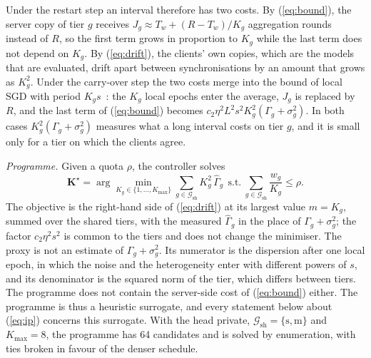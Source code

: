 \documentclass[journal]{IEEEtran}
\newcommand{\Gh}{\hat\Gamma}
\begin{document}
Under the restart step an interval therefore has two costs. By (\ref{eq:bound}), the server copy of tier $g$ receives $J_g\approx T_w+(R-T_w)/K_g$ aggregation rounds instead of $R$, so the first term grows in proportion to $K_g$ while the last term does not depend on $K_g$. By (\ref{eq:drift}), the clients' own copies, which are the models that are evaluated, drift apart between synchronisations by an amount that grows as $K_g^2$. Under the carry-over step the two costs merge into the bound of local SGD with period $K_gs$~\cite{wang2021coop}: the $K_g$ local epochs enter the average, $J_g$ is replaced by $R$, and the last term of (\ref{eq:bound}) becomes $c_2\eta^2L^2s^2K_g^2(\Gamma_g+\sigma_g^2)$. In both cases $K_g^2(\Gamma_g+\sigma_g^2)$ measures what a long interval costs on tier $g$, and it is small only for a tier on which the clients agree.

\emph{Programme.} Given a quota $\rho$, the controller solves
\begin{equation}
\mathbf K^\star=\arg\min_{K_g\in\{1,\dots,K_{\max}\}}\sum_{g\in\mathcal G_{\mathrm{sh}}}K_g^2\,\Gh_g\ \ \text{s.t.}\ \sum_{g\in\mathcal G_{\mathrm{sh}}}\frac{w_g}{K_g}\le\rho .
\label{eq:ip}
\end{equation}
The objective is the right-hand side of (\ref{eq:drift}) at its largest value $m=K_g$, summed over the shared tiers, with the measured $\Gh_g$ in the place of $\Gamma_g+\sigma_g^2$; the factor $c_2\eta^2s^2$ is common to the tiers and does not change the minimiser. The proxy is not an estimate of $\Gamma_g+\sigma_g^2$. Its numerator is the dispersion after one local epoch, in which the noise and the heterogeneity enter with different powers of $s$, and its denominator is the squared norm of the tier, which differs between tiers. The programme does not contain the server-side cost of (\ref{eq:bound}) either. The programme is thus a heuristic surrogate, and every statement below about (\ref{eq:ip}) concerns this surrogate. With the head private, $\mathcal G_{\mathrm{sh}}=\{\mathrm s,\mathrm m\}$ and $K_{\max}=8$, the programme has 64 candidates and is solved by enumeration, with ties broken in favour of the denser schedule.
\end{document}
